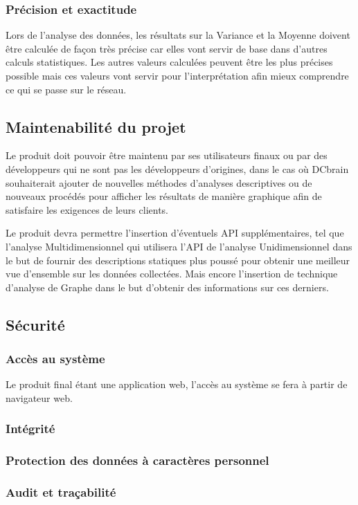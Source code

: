 			\subsubsection{Précision et exactitude}
			Lors de l'analyse des données, les résultats sur la Variance et la Moyenne doivent être calculée de façon très précise car elles vont servir de base dans d’autres calculs statistiques. Les autres valeurs calculées peuvent être les plus précises possible mais ces valeurs vont servir pour l'interprétation afin mieux comprendre ce qui se passe sur le réseau.

		\subsection{Maintenabilité du projet}
		Le produit doit pouvoir être maintenu par ses utilisateurs finaux ou par des développeurs qui ne sont pas les développeurs d’origines, dans le cas où DCbrain souhaiterait ajouter de nouvelles méthodes d’analyses descriptives ou de nouveaux procédés pour afficher les résultats de manière graphique afin de satisfaire les exigences de leurs clients.\newline
		
		Le produit devra permettre l'insertion d'éventuels API supplémentaires, tel que l'analyse Multidimensionnel qui utilisera l'API de l'analyse Unidimensionnel dans le but de fournir des descriptions statiques plus poussé pour obtenir une meilleur vue d'ensemble sur les données collectées. Mais encore l'insertion de technique d'analyse de Graphe dans le but d'obtenir des informations sur ces derniers.
		
		\subsection{Sécurité} 
			\subsubsection{Accès au système}
			Le produit final étant une application web, l'accès au système se fera à partir de navigateur web.
			\subsubsection{Intégrité}
			\subsubsection{Protection des données à caractères personnel}
			\subsubsection{Audit et traçabilité}
		
